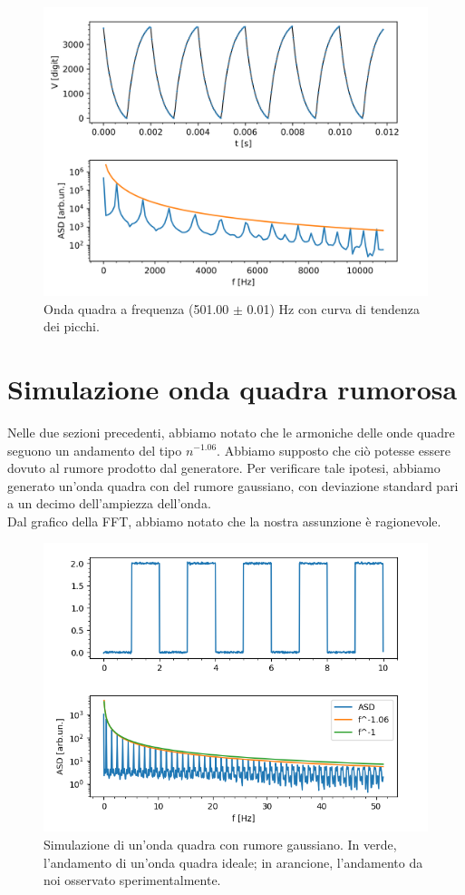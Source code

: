 \documentclass{article}[a4paper, oneside,11pt]
\begin{document}
\begin{figure}[H]
    \centering
    \includegraphics[width=0.80\columnwidth]{img/ese6/esp6-501.00Hz-retta.png}
    \caption{Onda quadra a frequenza (501.00 $\pm$ 0.01) Hz con curva di tendenza dei picchi.}
    \label{fig:ese6-retta}
\end{figure}

\section{Simulazione onda quadra rumorosa}
Nelle due sezioni precedenti, abbiamo notato che le armoniche delle onde quadre seguono un andamento del tipo $n^{-1.06}$. Abbiamo supposto che ciò potesse essere dovuto al rumore prodotto dal generatore. Per verificare tale ipotesi, abbiamo generato un'onda quadra con del rumore gaussiano, con deviazione standard pari a un decimo dell'ampiezza dell'onda.\\
Dal grafico della FFT, abbiamo notato che la nostra assunzione è ragionevole.
\begin{figure}[H]
    \centering
    \includegraphics[width=0.80\columnwidth]{img/onda_quadra_noisy.png}
    \caption{Simulazione di un'onda quadra con rumore gaussiano. In verde, l'andamento di un'onda quadra ideale; in arancione, l'andamento da noi osservato sperimentalmente.}
    \label{fig:ese6-retta}
\end{figure}
\end{document}
